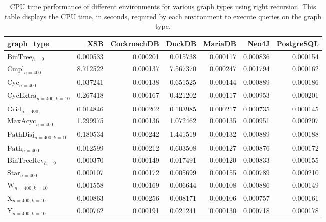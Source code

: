 \begin{table}
\caption{CPU time performance of different environments for various graph types using right recursion. This table displays the CPU time, in seconds, required by each environment to execute queries on the graph type.}
\label{table:results}
\begin{tabular}{lrrrrrr}
\toprule
graph\_type & XSB & CockroachDB & DuckDB & MariaDB & Neo4J & PostgreSQL \\
\midrule
$\text{BinTree}_{h=9}$ & 0.000533 & 0.000201 & 0.015738 & 0.000117 & 0.000836 & 0.000154 \\
$\text{Cmpl}_{n=400}$ & 8.712522 & 0.000137 & 7.567370 & 0.000247 & 0.001794 & 0.000162 \\
$\text{Cyc}_{n=400}$ & 0.037241 & 0.000138 & 0.651525 & 0.000144 & 0.000889 & 0.000186 \\
$\text{CycExtra}_{n=400,k=10}$ & 0.267418 & 0.000167 & 0.421202 & 0.000117 & 0.000953 & 0.000201 \\
$\text{Grid}_{n=400}$ & 0.014846 & 0.000202 & 0.103985 & 0.000217 & 0.000735 & 0.000145 \\
$\text{MaxAcyc}_{n=400}$ & 1.299975 & 0.000136 & 1.072462 & 0.000135 & 0.000951 & 0.000207 \\
$\text{PathDisj}_{n=400,k=10}$ & 0.180534 & 0.000242 & 1.441519 & 0.000132 & 0.000889 & 0.000188 \\
$\text{Path}_{n=400}$ & 0.012599 & 0.000212 & 0.603508 & 0.000127 & 0.000876 & 0.000172 \\
$\text{BinTreeRev}_{h=9}$ & 0.000370 & 0.000149 & 0.017491 & 0.000120 & 0.000833 & 0.000155 \\
$\text{Star}_{n=400}$ & 0.000107 & 0.000172 & 0.005699 & 0.000155 & 0.000789 & 0.000210 \\
$\text{W}_{n=400,k=10}$ & 0.001558 & 0.000169 & 0.006644 & 0.000108 & 0.000886 & 0.000149 \\
$\text{X}_{n=400, k=10}$ & 0.000863 & 0.000256 & 0.008171 & 0.000106 & 0.000757 & 0.000161 \\
$\text{Y}_{n=400,k=10}$ & 0.000762 & 0.000191 & 0.021241 & 0.000130 & 0.000718 & 0.000178 \\
\bottomrule
\end{tabular}
\end{table}
